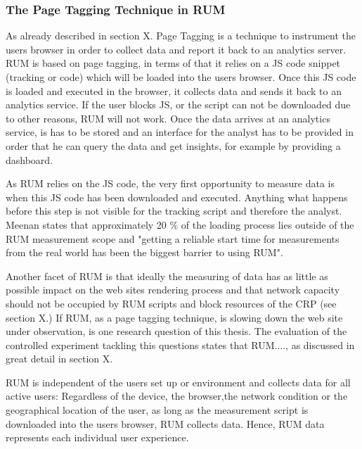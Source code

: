 \subsubsection{The Page Tagging Technique in RUM}


As already described in section X. Page Tagging is a technique to instrument the users browser in order to collect data and report it back to an analytics server.
RUM is based on page tagging, in terms of that it relies on a JS code snippet (tracking or code) which will be loaded into the users browser.
Once this JS code is loaded and executed in the browser, it collects data and sends it back to an analytics service.
If the user blocks JS, or the script can not be downloaded due to other reasons,  RUM will not work.
Once the data arrives at an analytics service, is has to be stored and an interface for the analyst has to be provided in order that he can query the data and get insights, for example by providing a dashboard. %

As RUM relies on the JS code, the very first opportunity to measure data is when this JS code has been downloaded and executed.
Anything what happens before this step is not visible for the tracking script and therefore the analyst.
Meenan states that approximately 20 \% of the loading process lies outside of the RUM measurement scope and "getting a reliable start time for measurements from the real world has been the biggest barrier to using RUM".%

Another facet of RUM is that ideally the measuring of data has as little as possible impact on the web sites rendering process and that network capacity should not be occupied by RUM scripts and block resources of the CRP (see section X.) %
If RUM, as a page tagging technique, is slowing down the web site under observation, is one research question of this thesis.
The evaluation of the controlled experiment tackling this questions states that RUM...., as discussed in great detail in section X. %



RUM is independent of the users set up or environment and collects data for all active users:
Regardless of the device, the browser,the network condition or the geographical location of the user, as long as the measurement script is downloaded into the users browser, RUM collects data.%
Hence, RUM data represents each individual user experience. %

